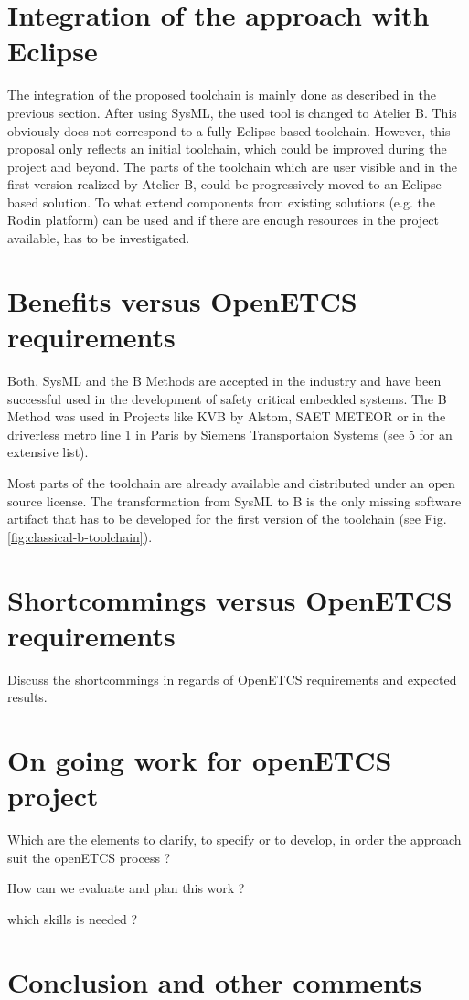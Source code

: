 \section{Integration of the approach with Eclipse}

The integration of the proposed toolchain is mainly done as described
in the previous section. After using SysML, the used tool is changed
to Atelier B. This obviously does not correspond to a fully Eclipse
based toolchain. However, this proposal only reflects an initial
toolchain, which could be improved during the project and beyond. The
parts of the toolchain which are user visible and in the first version
realized by Atelier B, could be progressively moved to an Eclipse
based solution. To what extend components from existing solutions
(e.g. the Rodin platform) can be used and if there are enough
resources in the project available, has to be investigated.

\section{Benefits versus OpenETCS requirements}

Both, SysML and the B Methods are accepted in the industry and have
been successful used in the development of safety critical embedded
systems. The B Method was used in Projects like KVB by Alstom, SAET
METEOR or in the driverless metro line 1 in Paris by Siemens
Transportaion Systems (see \ref{} for an extensive list).

Most parts of the toolchain are already available and distributed
under an open source license. The transformation from SysML to B is
the only missing software artifact that has to be developed for the
first version of the toolchain (see
Fig. \ref{fig:classical-b-toolchain}).

\section{Shortcommings versus OpenETCS requirements}

\begin{todo_comment}
Discuss the shortcommings in regards of OpenETCS requirements and expected results.
\end{todo_comment}

\section{On going work for openETCS project}

\begin{todo_comment}
Which are the elements to clarify, to specify or to develop, in order the approach suit the openETCS process ?

How can we evaluate and plan this work ?

which skills is needed ?
\end{todo_comment}

\section{Conclusion and other comments}

